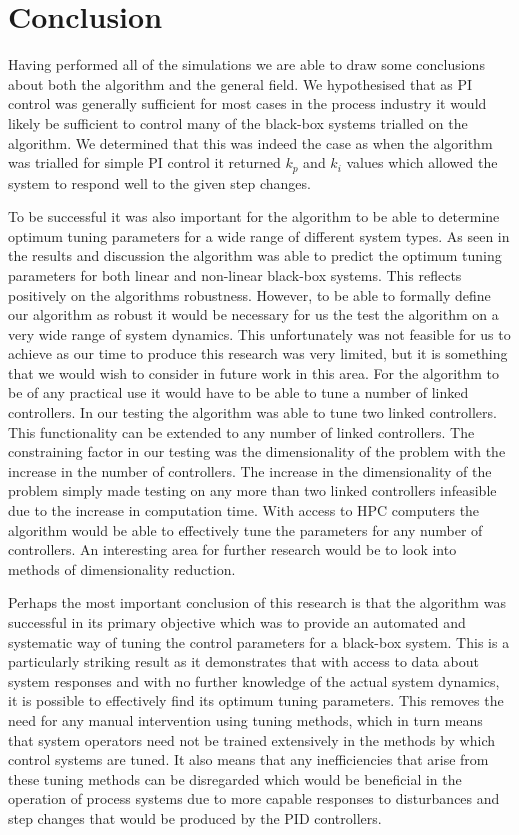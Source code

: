 \documentclass[conference]{IEEEtran}
\theoremstyle{definition}
\begin{document}

\section{Conclusion}
\noindent Having performed all of the simulations we are able to draw some conclusions about both the algorithm and the general field. We hypothesised that as PI control was generally sufficient for most cases in the process industry it would likely be sufficient to control many of the black-box systems trialled on the algorithm. We determined that this was indeed the case as when the algorithm was trialled for simple PI control it returned $k_p$ and $k_i$ values which allowed the system to respond well to the given step changes. 

To be successful it was also important for the algorithm to be able to determine optimum tuning parameters for a wide range of different system types. As seen in the results and discussion the algorithm was able to predict the optimum tuning parameters for both linear and non-linear black-box systems. This reflects positively on the algorithms robustness. However, to be able to formally define our algorithm as robust it would be necessary for us the test the algorithm on a very wide range of system dynamics. This unfortunately was not feasible for us to achieve as our time to produce this research was very limited, but it is something that we would wish to consider in future work in this area. For the algorithm to be of any practical use it would have to be able to tune a number of linked controllers. In our testing the algorithm was able to tune two linked controllers. This functionality can be extended to any number of linked controllers. The constraining factor in our testing was the dimensionality of the problem with the increase in the number of controllers. The increase in the dimensionality of the problem simply made testing on any more than two linked controllers infeasible due to the increase in computation time. With access to HPC computers the algorithm would be able to effectively tune the parameters for any number of controllers. An interesting area for further research would be to look into methods of dimensionality reduction. 

Perhaps the most important conclusion of this research is that the algorithm was successful in its primary objective which was to provide an automated and systematic way of tuning the control parameters for a black-box system. This is a particularly striking result as it demonstrates that with access to data about system responses and with no further knowledge of the actual system dynamics, it is possible to effectively find its optimum tuning parameters. This removes the need for any manual intervention using tuning methods, which in turn means that system operators need not be trained extensively in the methods by which control systems are tuned. It also means that any inefficiencies that arise from these tuning methods can be disregarded which would be beneficial in the operation of process systems due to more capable responses to disturbances and step changes that would be produced by the PID controllers. 
\end{document}
